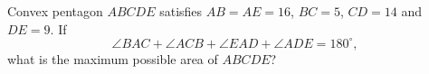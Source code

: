 Convex pentagon $ABCDE$ satisfies $AB=AE=16$, $BC=5$, $CD=14$ and $DE=9$. If
\[
\angle BAC+\angle ACB+\angle EAD+\angle ADE=180^\circ,
\]
what is the maximum possible area of $ABCDE$?
